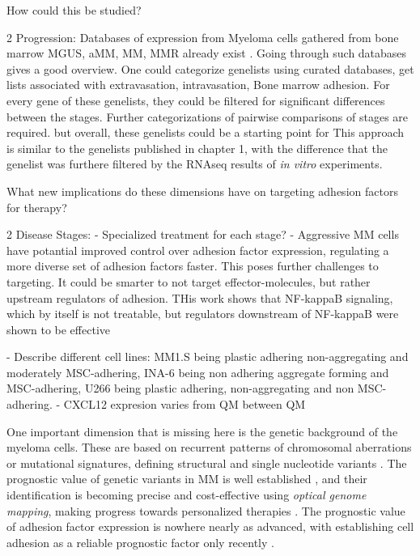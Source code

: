 How could this be studied?

2 Progression: Databases of expression from Myeloma cells gathered from bone
marrow \ac{MGUS}, \ac{aMM}, \ac{MM}, \ac{MMR} already exist
\citet{akhmetzyanovaDynamicCD138Surface2020,
      seckingerCD38ImmunotherapeuticTarget2018}. Going through such databases gives a
good overview. One could categorize genelists using curated databases, get lists
associated with extravasation, intravasation, Bone marrow adhesion. For every
gene of these genelists, they could be filtered for significant differences
between the stages. Further categorizations of pairwise comparisons of stages
are required. but overall, these genelists could be a starting point for This
approach is similar to the genelists published in chapter 1, with the difference
that the genelist was furthere filtered by the RNAseq results of \textit{in
      vitro} experiments.



What new implications do these dimensions have on targeting adhesion factors for
therapy?


2 Disease Stages:
- Specialized treatment for each stage?
- Aggressive MM cells have potantial improved control over adhesion factor expression,
regulating a more diverse set of adhesion factors faster. This poses further challenges to targeting.
It could be smarter to not target effector-molecules, but rather upstream regulators of adhesion.
THis work shows that NF-kappaB signaling, which by itself is not treatable, but regulators
downstream of NF-kappaB were shown to be effective \cite{adamikEZH2HDAC1Inhibition2017,adamikXRK3F2InhibitionP62ZZ2018}




\unnsubsection{\cadddiversitytitle}%
\label{sec:discussion_cadddiversity}%

- Describe different cell lines: MM1.S being plastic adhering non-aggregating and moderately MSC-adhering, INA-6 being non adhering aggregate forming and MSC-adhering, U266 being plastic adhering, non-aggregating and non MSC-adhering.
- CXCL12 expresion varies from QM between QM

One important dimension that is missing here is the genetic background of the
myeloma cells. These are based on recurrent patterns of chromosomal aberrations
or mutational signatures, defining structural and single nucleotide variants
\cite{kumarMultipleMyelomasCurrent2018a,
      hoangMutationalProcessesContributing2019}. The prognostic value of genetic
variants in MM is well established \cite{sharmaPrognosticRoleMYC2021}, and their
identification is becoming precise and cost-effective using \emph{optical
      genome mapping}, making progress towards personalized therapies
\cite{zouComprehensiveApproachEvaluate2024,
      budurleanIntegratingOpticalGenome2024}. The prognostic value of adhesion factor
expression is nowhere nearly as advanced, with establishing cell adhesion as a
reliable prognostic factor only recently
\cite{huDevelopmentCellAdhesionbased2024}.



